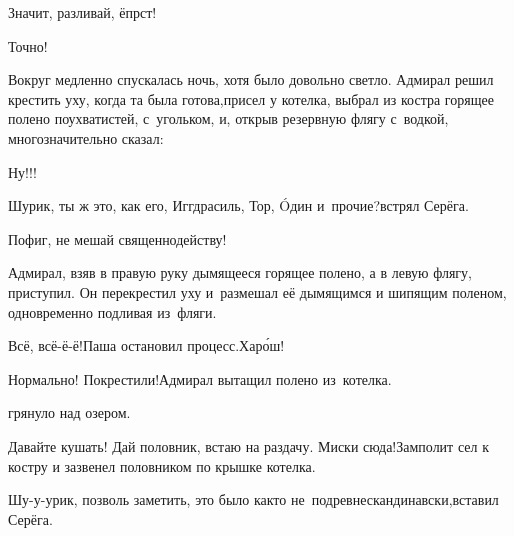 \diagdash Значит, разливай, ёпрст!

\diagdash Точно!


Вокруг медленно спускалась ночь, хотя было довольно светло. Адмирал решил крестить уху, когда та была готова,\mdash присел у котелка, выбрал из костра горящее полено поухватистей, с~угольком, и, открыв резервную флягу с~водкой, многозначительно сказал:

\diagdash Ну!!!

\diagdash Шурик, ты ж это, как его, Иггдрасиль, Тор, {\'{O}}дин и~прочие?\mdash встрял Серёга.

\diagdash Пофиг, не мешай священнодейству!

Адмирал, взяв в правую руку дымящееся горящее полено, а в левую флягу, приступил. Он перекрестил уху и~размешал её дымящимся и шипящим поленом, одновременно подливая из~фляги.

\diagdash Всё, всё-ё-ё!\mdash Паша остановил процесс.\mdash Хар{\'о}ш!

\diagdash Нормально! Покрестили!\mdash Адмирал вытащил полено из~котелка.

\mdash грянуло над озером.

\diagdash Давайте кушать! Дай половник, встаю на раздачу. Миски сюда!\mdash Замполит сел к костру и зазвенел половником по крышке котелка.

\diagdash Шу-у-урик, позволь заметить, это было как\sdash то не~по\sdash древнескандинавски,\mdash вставил Серёга.

%
%

